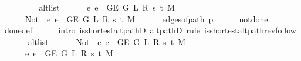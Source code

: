 \begin{isabellebody}
\isanewline
\ \ \isanewline
\ \ \isamarkupfalse%
\isanewline
\ \ \ \ {\isachardoublequoteopen}alt{\isacharunderscore}{\kern0pt}list\isanewline
\ \ \ \ \ \ {\isacharparenleft}{\kern0pt}{\isasymlambda}e{\isachardot}{\kern0pt}\ e\ {\isasymin}\ {\isacharparenleft}{\kern0pt}G{\isachardot}{\kern0pt}E\ {\isacharparenleft}{\kern0pt}G{}\ L\ R\ s\ t\ M{\isacharparenright}{\kern0pt}{\isacharparenright}{\kern0pt}{\isacharparenright}{\kern0pt}\isanewline
\ \ \ \ \ \ {\isacharparenleft}{\kern0pt}Not\ {\isasymcirc}\ {\isacharparenleft}{\kern0pt}{\isasymlambda}e{\isachardot}{\kern0pt}\ e\ {\isasymin}\ {\isacharparenleft}{\kern0pt}G{\isachardot}{\kern0pt}E\ {\isacharparenleft}{\kern0pt}G{}\ L\ R\ s\ t\ M{\isacharparenright}{\kern0pt}{\isacharparenright}{\kern0pt}{\isacharparenright}{\kern0pt}{\isacharparenright}{\kern0pt}\isanewline
\ \ \ \ \ \ {\isacharparenleft}{\kern0pt}edges{\isacharunderscore}{\kern0pt}of{\isacharunderscore}{\kern0pt}path\ {\isacharquery}{\kern0pt}p{\isacharparenright}{\kern0pt}{\isachardoublequoteclose}\isanewline
\ \ \ \ \isamarkupfalse%
\ not{\isacharunderscore}{\kern0pt}done{\isacharunderscore}{\kern0pt}{}\isanewline
\ \ \ \ \isamarkupfalse%
\ done{\isacharunderscore}{\kern0pt}{}{\isacharunderscore}{\kern0pt}def\isanewline
\ \ \ \ \isamarkupfalse%
\ {\isacharparenleft}{\kern0pt}intro\ is{\isacharunderscore}{\kern0pt}shortest{\isacharunderscore}{\kern0pt}alt{\isacharunderscore}{\kern0pt}pathD{\isacharparenleft}{\kern0pt}{}{\isacharparenright}{\kern0pt}\ alt{\isacharunderscore}{\kern0pt}pathD{\isacharparenleft}{\kern0pt}{}{\isacharparenright}{\kern0pt}{\isacharparenright}{\kern0pt}\ {\isacharparenleft}{\kern0pt}rule\ is{\isacharunderscore}{\kern0pt}shortest{\isacharunderscore}{\kern0pt}alt{\isacharunderscore}{\kern0pt}path{\isacharunderscore}{\kern0pt}rev{\isacharunderscore}{\kern0pt}follow{\isacharparenright}{\kern0pt}\isanewline
\ \ \isamarkupfalse%
\isanewline
\ \ \ \ {\isachardoublequoteopen}alt{\isacharunderscore}{\kern0pt}list\isanewline
\ \ \ \ \ \ {\isacharparenleft}{\kern0pt}Not\ {\isasymcirc}\ {\isacharparenleft}{\kern0pt}{\isasymlambda}e{\isachardot}{\kern0pt}\ e\ {\isasymin}\ {\isacharparenleft}{\kern0pt}G{\isachardot}{\kern0pt}E\ {\isacharparenleft}{\kern0pt}G{}\ L\ R\ s\ t\ M{\isacharparenright}{\kern0pt}{\isacharparenright}{\kern0pt}{\isacharparenright}{\kern0pt}{\isacharparenright}{\kern0pt}\isanewline
\ \ \ \ \ \ {\isacharparenleft}{\kern0pt}{\isasymlambda}e{\isachardot}{\kern0pt}\ e\ {\isasymin}\ {\isacharparenleft}{\kern0pt}G{\isachardot}{\kern0pt}E\ {\isacharparenleft}{\kern0pt}G{}\ L\ R\ s\ t\ M{\isacharparenright}{\kern0pt}{\isacharparenright}{\kern0pt}{\isacharparenright}{\kern0pt}\isanewline

\end{isabellebody}

